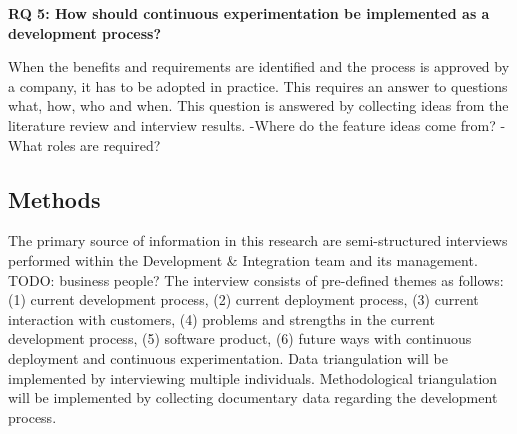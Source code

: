 \documentclass[english]{tktltiki2}
\theoremstyle{definition}
\theoremstyle{remark}
\begin{document}
\noindent \textbf{RQ 5: How should continuous experimentation be implemented as a development process?}

\noindent When the benefits and requirements are identified and the process is approved by a company, it has to be adopted in practice. This requires an answer to questions what, how, who and when. This question is answered by collecting ideas from the literature review and interview results. \newline
-Where do the feature ideas come from?
-What roles are required?

\subsection{Methods} %
The primary source of information in this research are semi-structured interviews performed within the Development & Integration team and its management. TODO: business people? The interview consists of pre-defined themes as follows: (1) current development process, (2) current deployment process, (3) current interaction with customers, (4) problems and strengths in the current development process, (5) software product, (6) future ways with continuous deployment and continuous experimentation. Data triangulation will be implemented by interviewing multiple individuals. Methodological triangulation will be implemented by collecting documentary data regarding the development process.
\end{document}
